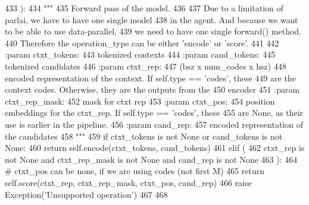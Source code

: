 \begin{DoxyCode}
433     ):
434         \textcolor{stringliteral}{"""}
435 \textcolor{stringliteral}{        Forward pass of the model.}
436 \textcolor{stringliteral}{}
437 \textcolor{stringliteral}{        Due to a limitation of parlai, we have to have one single model}
438 \textcolor{stringliteral}{        in the agent. And because we want to be able to use data-parallel,}
439 \textcolor{stringliteral}{        we need to have one single forward() method.}
440 \textcolor{stringliteral}{        Therefore the operation\_type can be either 'encode' or 'score'.}
441 \textcolor{stringliteral}{}
442 \textcolor{stringliteral}{        :param ctxt\_tokens:}
443 \textcolor{stringliteral}{            tokenized contexts}
444 \textcolor{stringliteral}{        :param cand\_tokens:}
445 \textcolor{stringliteral}{            tokenized candidates}
446 \textcolor{stringliteral}{        :param ctxt\_rep:}
447 \textcolor{stringliteral}{            (bsz x num\_codes x hsz)}
448 \textcolor{stringliteral}{            encoded representation of the context. If self.type == 'codes', these}
449 \textcolor{stringliteral}{            are the context codes. Otherwise, they are the outputs from the}
450 \textcolor{stringliteral}{            encoder}
451 \textcolor{stringliteral}{        :param ctxt\_rep\_mask:}
452 \textcolor{stringliteral}{            mask for ctxt rep}
453 \textcolor{stringliteral}{        :param ctxt\_pos:}
454 \textcolor{stringliteral}{            position embeddings for the ctxt\_rep. If self.type == 'codes', these}
455 \textcolor{stringliteral}{            are None, as their use is earlier in the pipeline.}
456 \textcolor{stringliteral}{        :param cand\_rep:}
457 \textcolor{stringliteral}{            encoded representation of the candidates}
458 \textcolor{stringliteral}{        """}
459         \textcolor{keywordflow}{if} ctxt\_tokens \textcolor{keywordflow}{is} \textcolor{keywordflow}{not} \textcolor{keywordtype}{None} \textcolor{keywordflow}{or} cand\_tokens \textcolor{keywordflow}{is} \textcolor{keywordflow}{not} \textcolor{keywordtype}{None}:
460             \textcolor{keywordflow}{return} self.encode(ctxt\_tokens, cand\_tokens)
461         \textcolor{keywordflow}{elif} (
462             ctxt\_rep \textcolor{keywordflow}{is} \textcolor{keywordflow}{not} \textcolor{keywordtype}{None} \textcolor{keywordflow}{and} ctxt\_rep\_mask \textcolor{keywordflow}{is} \textcolor{keywordflow}{not} \textcolor{keywordtype}{None} \textcolor{keywordflow}{and} cand\_rep \textcolor{keywordflow}{is} \textcolor{keywordflow}{not} \textcolor{keywordtype}{None}
463         ):
464             \textcolor{comment}{# ctxt\_pos can be none, if we are using codes (not first M)}
465             \textcolor{keywordflow}{return} self.score(ctxt\_rep, ctxt\_rep\_mask, ctxt\_pos, cand\_rep)
466         \textcolor{keywordflow}{raise} Exception(\textcolor{stringliteral}{'Unsupported operation'})
467 
468 
\end{DoxyCode}
